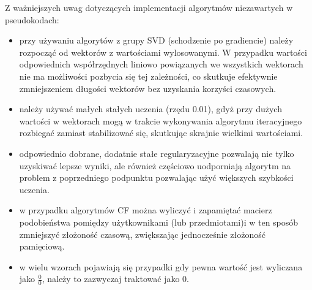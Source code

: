 \documentclass{pracamgr}
\begin{document}
   Z ważniejszych uwag dotyczących implementacji algorytmów niezawartych w pseudokodach:
   \begin{itemize}\itemsep1pt \parskip0pt 
    \item przy używaniu algorytów z grupy SVD (schodzenie po gradiencie) należy rozpocząć od wektorów z wartościami wylosowanymi.
     W przypadku wartości odpowiednich współrzędnych liniowo powiązanych we wszystkich wektorach nie ma możliwości pozbycia się tej zależności,
     co skutkuje efektywnie zmniejszeniem długości wektorów bez uzyskania korzyści czasowych.
    \item należy używać małych stałych uczenia (rzędu 0.01), gdyż przy dużych wartości w wektorach mogą w trakcie wykonywania algorytmu
     iteracyjnego rozbiegać zamiast stabilizować się, skutkując skrajnie wielkimi wartościami.
    \item odpowiednio dobrane, dodatnie stałe regularyzacyjne pozwalają nie tylko uzyskiwać lepsze wyniki, ale również częściowo uodporniają
     algorytm na problem z poprzedniego podpunktu pozwalając użyć większych szybkości uczenia.
    \item w przypadku algorytmów CF można wyliczyć i zapamiętać macierz podobieństwa pomiędzy użytkownikami (lub przedmiotami)i w ten sposób
     zmniejszyć złożoność czasową, zwiększając jednocześnie złożoność pamięciową.
    \item w wielu wzorach pojawiają się przypadki gdy pewna wartość jest wyliczana jako $\frac{0}{0}$, należy to zazwyczaj traktować jako $0$.
   \end{itemize}
\end{document}
